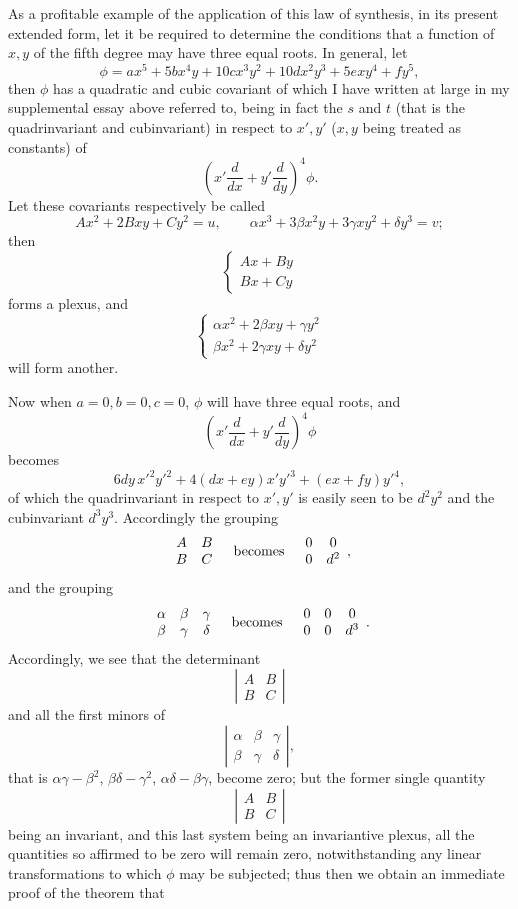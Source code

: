 \documentclass[11pt]{article}
\newcommand{\sourcepage}[1]{\marginpar{\scriptsize p.~#1}}
\begin{document}
{{\sourcepage{348}
As a profitable example of the application of this law of synthesis, in its present extended form, let it be required to determine the conditions that a function of $x,y$ of the fifth degree may have three equal roots. In general, let
\[
\phi=ax^5+5bx^4y+10cx^3y^2+10dx^2y^3+5exy^4+fy^5,
\]
then $\phi$ has a quadratic and cubic covariant of which I have written at large in my supplemental essay above referred to, being in fact the $s$ and $t$ (that is the quadrinvariant and cubinvariant) in respect to $x',y'$ ($x,y$ being treated as constants) of
\[
\left(x'\frac{d}{dx}+y'\frac{d}{dy}\right)^4\phi.
\]
Let these covariants respectively be called
\[
Ax^2+2Bxy+Cy^2=u,
\qquad
\alpha x^3+3\beta x^2y+3\gamma xy^2+\delta y^3=v;
\]
then
\[
\left\{\begin{matrix} Ax+By\\ Bx+Cy\end{matrix}\right.
\]
forms a plexus, and
\[
\left\{\begin{matrix}
\alpha x^2+2\beta xy+\gamma y^2\\
\beta x^2+2\gamma xy+\delta y^2
\end{matrix}\right.
\]
will form another.

Now when $a=0,b=0,c=0$, $\phi$ will have three equal roots, and
\[
\left(x'\frac{d}{dx}+y'\frac{d}{dy}\right)^4\phi
\]
becomes
\[
6dy\,x'^2y'^2+4(dx+ey)x'y'^3+(ex+fy)y'^4,
\]
of which the quadrinvariant in respect to $x',y'$ is easily seen to be $d^2y^2$ and the cubinvariant $d^3y^3$. Accordingly the grouping
\[
\begin{array}{cc}
A&B\\ B&C
\end{array}
\quad\hbox{becomes}\quad
\begin{array}{cc}0&0\\0&d^2\end{array},
\]
and the grouping
\[
\begin{array}{ccc}
\alpha&\beta&\gamma\\
\beta&\gamma&\delta
\end{array}
\quad\hbox{becomes}\quad
\begin{array}{ccc}0&0&0\\0&0&d^3\end{array}.
\]
Accordingly, we see that the determinant
\[
\left|\begin{array}{cc}A&B\\B&C\end{array}\right|
\]
and all the first minors of
\[
\left|\begin{array}{ccc}\alpha&\beta&\gamma\\ \beta&\gamma&\delta\end{array}\right|,
\]
that is $\alpha\gamma-\beta^2$, $\beta\delta-\gamma^2$, $\alpha\delta-\beta\gamma$, become zero; but the former single quantity
\[
\left|\begin{array}{cc}A&B\\B&C\end{array}\right|
\]
being an invariant, and this last system being an invariantive plexus, all the quantities so affirmed to be zero will remain zero, notwithstanding any linear transformations to which $\phi$ may be subjected; thus then we obtain an immediate proof of the theorem that

}}
\end{document}
